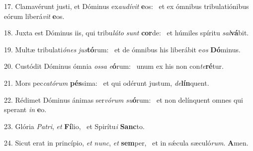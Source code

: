 17. Clamavérunt justi, et Dóminus ex\textit{au}\textit{dí}\textit{vit} \textbf{e}os: \ast\  et ex ómnibus tribulatiónibus eórum liberá\textit{vit} \textbf{e}os.\

18. Juxta est Dóminus iis, qui tribu\textit{lá}\textit{to} \textit{sunt} \textbf{cor}de: \ast\  et húmiles spíritu \textit{sal}\textbf{vá}bit.\

19. Multæ tribulati\textit{ó}\textit{nes} \textit{jus}\textbf{tó}rum: \ast\  et de ómnibus his liberábit e\textit{os} \textbf{Dó}minus.\

20. Custódit Dóminus ómnia \textit{os}\textit{sa} \textit{e}\textbf{ó}rum: \ast\  unum ex his non con\textit{te}\textbf{ré}tur.\

21. Mors pec\textit{ca}\textit{tó}\textit{rum} \textbf{pés}sima: \ast\  et qui odérunt justum, \textit{de}\textbf{lín}quent.\

22. Rédimet Dóminus ánimas ser\textit{vó}\textit{rum} \textit{su}\textbf{ó}rum: \ast\  et non delínquent omnes qui sperant \textit{in} \textbf{e}o.\

23. Glória \textit{Pa}\textit{tri}, \textit{et} \textbf{Fí}lio, \ast\  et Spirítu\textit{i} \textbf{Sanc}to.\

24. Sicut erat in princípio, \textit{et} \textit{nunc}, \textit{et} \textbf{sem}per, \ast\  et in sǽcula sæculó\textit{rum}. \textbf{A}men.\

